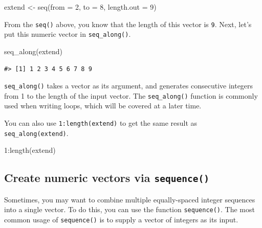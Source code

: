 \documentclass[
]{book}
\newenvironment{Shaded}{\begin{snugshade}}{\end{snugshade}}
\newcommand{\AttributeTok}[1]{\textcolor[rgb]{0.77,0.63,0.00}{#1}}
\newcommand{\DecValTok}[1]{\textcolor[rgb]{0.00,0.00,0.81}{#1}}
\newcommand{\FunctionTok}[1]{\textcolor[rgb]{0.00,0.00,0.00}{#1}}
\newcommand{\NormalTok}[1]{#1}
\newcommand{\OtherTok}[1]{\textcolor[rgb]{0.56,0.35,0.01}{#1}}
\newcommand{\SpecialCharTok}[1]{\textcolor[rgb]{0.00,0.00,0.00}{#1}}
\newenvironment{infobox}[1]
  {
  \begin{itemize}
  \renewcommand{\labelitemi}{
    \raisebox{-.7\height}[0pt][0pt]{
      {\setkeys{Gin}{width=3em,keepaspectratio}
        \texttt{[image: pics/\#1]}}
    }
  }
  \setlength{\fboxsep}{1em}
  \begin{blackbox}
  \item
  }
  {
  \end{blackbox}
  \end{itemize}
  }
\newenvironment{blackbox}{
  \definecolor{shadecolor}{rgb}{0, 0, 0}  %
  \color{white}
  \begin{shaded}}
 {\end{shaded}}
\begin{document}
\begin{Shaded}
\begin{Highlighting}[]
\NormalTok{extend }\OtherTok{\textless{}{-}} \FunctionTok{seq}\NormalTok{(}\AttributeTok{from =} \DecValTok{2}\NormalTok{, }\AttributeTok{to =} \DecValTok{8}\NormalTok{, }\AttributeTok{length.out =} \DecValTok{9}\NormalTok{) }
\end{Highlighting}
\end{Shaded}

From the \texttt{seq()} above, you know that the length of this vector is \texttt{9}. Next, let's put this numeric vector in \texttt{seq\_along()}.

\begin{Shaded}
\begin{Highlighting}[]
\FunctionTok{seq\_along}\NormalTok{(extend)}
\end{Highlighting}
\end{Shaded}

\begin{verbatim}
#> [1] 1 2 3 4 5 6 7 8 9
\end{verbatim}

\texttt{seq\_along()} takes a vector as its argument, and generates consecutive integers from 1 to the length of the input vector. The \texttt{seq\_along()} function is commonly used when writing loops, which will be covered at a later time.

\begin{infobox}{caution}

You can also use \texttt{1:length(extend)} to get the same result as \texttt{seq\_along(extend)}.

\begin{Shaded}
\begin{Highlighting}[]
\DecValTok{1}\SpecialCharTok{:}\FunctionTok{length}\NormalTok{(extend)}
\end{Highlighting}
\end{Shaded}

\end{infobox}

\hypertarget{create-numeric-vectors-via-sequence}{%
\subsection{\texorpdfstring{Create numeric vectors via \texttt{sequence()}}{Create numeric vectors via sequence()}}\label{create-numeric-vectors-via-sequence}}

Sometimes, you may want to combine multiple equally-spaced integer sequences into a single vector. To do this, you can use the function \texttt{sequence()}. The most common usage of \texttt{sequence()} is to supply a vector of integers as its input.
\end{document}
